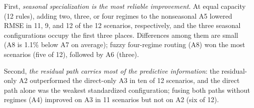\documentclass[preprint,12pt]{elsarticle}
\begin{document}
\begin{table}[!t]
\caption{Structural ablation: mean RMSE (GWh) over the six cities by horizon, worst scenario, scenarios in which persistence is beaten, final number of rules, and mean runtime per scenario. Sorted by overall mean RMSE.}
\label{tab:ablation_summary}
\centering
\small
{}
\end{table}

First, \emph{seasonal specialization is the most reliable improvement}. At equal capacity (12 rules), adding two, three, or four regimes to the nonseasonal A5 lowered RMSE in 11, 9, and 12 of the 12 scenarios, respectively, and the three seasonal configurations occupy the first three places. Differences among them are small (A8 is 1.1\% below A7 on average); fuzzy four-regime routing (A8) won the most scenarios (five of 12), followed by A6 (three).

Second, \emph{the residual path carries most of the predictive information}: the residual-only A2 outperformed the direct-only A3 in ten of 12 scenarios, and the direct path alone was the weakest standardized configuration; fusing both paths without regimes (A4) improved on A3 in 11 scenarios but not on A2 (six of 12).
\end{document}
